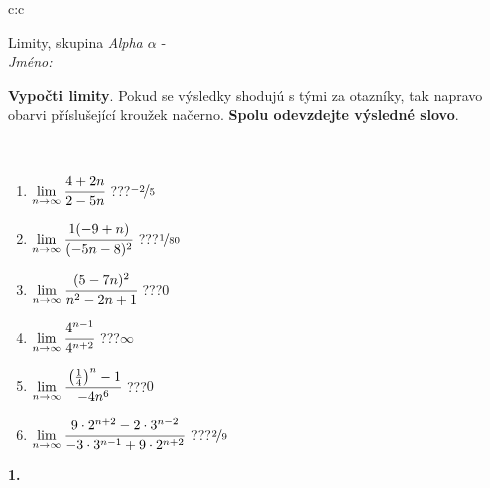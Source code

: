 \documentclass[10pt]{report}
\begin{document}
\thispagestyle{empty}
\begin{tabular}{c:c}
\begin{minipage}[c][104.5mm][t]{0.5\linewidth}
\begin{center}
\vspace{7mm}
{\huge Limity, skupina \textit{Alpha $\alpha$} -}\\[5mm]
\textit{Jméno:}\phantom{xxxxxxxxxxxxxxxxxxxxxxxxxxxxxxxxxxxxxxxxxxxxxxxxxxxxxxxxxxxxxxxxx}\\[5mm]
\begin{minipage}{0.95\linewidth}
\begin{center}
\textbf{Vypočti limity}. Pokud se výsledky shodujú s tými za otazníky, tak napravo\\obarvi příslušející kroužek načerno. \textbf{Spolu odevzdejte výsledné slovo}.
\end{center}
\end{minipage}
\\[1mm]
\begin{minipage}{0.79\linewidth}
\begin{center}
\begin{varwidth}{\linewidth}
\begin{enumerate}
\normalsize
\item $\lim\limits_{n\to\infty}\cfrac{4+2n}{2-5n}$\quad \dotfill\; ???\;\dotfill \quad $\nicefrac{-2}{5}$
\item $\lim\limits_{n\to\infty}\cfrac{1(-9+n)}{(-5n-8)^2}$\quad \dotfill\; ???\;\dotfill \quad $\nicefrac{1}{80}$
\item $\lim\limits_{n\to\infty}\cfrac{(5-7n)^2}{n^2-2n+1}$\quad \dotfill\; ???\;\dotfill \quad $0$
\item $\lim\limits_{n\to\infty}\cfrac{4^{n-1}}{4^{n+2}}$\quad \dotfill\; ???\;\dotfill \quad $\infty$
\item $\lim\limits_{n\to\infty}\cfrac{\left(\frac{1}{4}\right)^n -1}{-4n^{6}}$\quad \dotfill\; ???\;\dotfill \quad $0$
\item $\lim\limits_{n\to\infty}\cfrac{9\cdot 2^{n+2}-2\cdot 3^{n-2}}{-3\cdot 3^{n-1}+9\cdot 2^{n+2}}$\quad \dotfill\; ???\;\dotfill \quad $\nicefrac{2}{9}$
\end{enumerate}
\end{varwidth}
\end{center}
\end{minipage}
\begin{minipage}{0.20\linewidth}
\begin{center}
{\Huge\bfseries 1.} \\[2mm]

\end{center}
\end{minipage}
\end{center}
\end{minipage}
\end{tabular}
\end{document}
